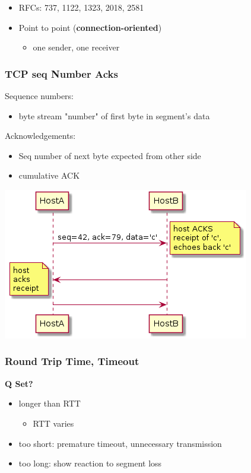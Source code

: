 \documentclass[11pt]{article}
\begin{document}
\begin{itemize}
\item RFCs: 737, 1122, 1323, 2018, 2581
\item Point to point (\textbf{connection-oriented})
\begin{itemize}
\item one sender, one receiver
\end{itemize}
\end{itemize}

\subsubsection{TCP seq Number Acks}
\label{sec:orgab166e2}
Sequence numbers:
\begin{itemize}
\item byte stream "number" of first byte in segment's data
\end{itemize}

Acknowledgements:
\begin{itemize}
\item Seq number of next byte expected from other side
\item cumulative ACK
\end{itemize}

\begin{center}
\includegraphics[width=.9\linewidth]{telnetEG.png}
\end{center}



\subsubsection{Round Trip Time, Timeout}
\label{sec:org0c640bb}
\textbf{Q Set?}
\begin{itemize}
\item longer than RTT
\begin{itemize}
\item RTT varies
\end{itemize}
\item too short: premature timeout, unnecessary transmission
\item too long: show reaction to segment loss
\end{itemize}
\end{document}
